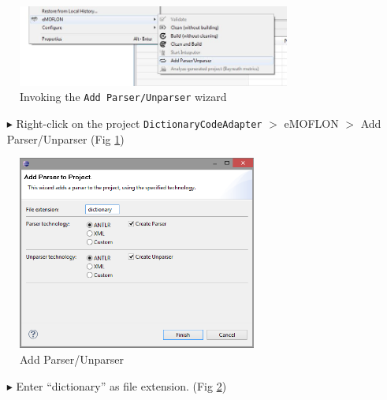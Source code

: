 
\begin{figure}[htp]
\begin{center}
 \includegraphics[width=0.8\textwidth]{pics/moca/2TextToMocaTree/1-AddParserAndUnparserWizard}
  \caption{Invoking the \texttt{Add Parser/Unparser} wizard} 
  \label{moca-1-AddParserAndUnparserWizard}
\end{center}
\end{figure}

\begin{enumerate}
\item[$\blacktriangleright$] Right-click on the project
\texttt{DictionaryCodeAdapter} $>$ eMOFLON $>$ Add Parser/Unparser (Fig
\ref{moca-1-AddParserAndUnparserWizard})
\end{enumerate}

\begin{figure}[htp]
\begin{center}
 \includegraphics[width=0.7\textwidth]{pics/moca/2TextToMocaTree/2-AddParser}
  \caption{Add Parser/Unparser}
  \label{moca-2-AddParser}
\end{center}
\end{figure}
 
\begin{enumerate}
\item[$\blacktriangleright$] Enter ``dictionary'' as file extension. (Fig
\ref{moca-2-AddParser})
\end{enumerate}
 
